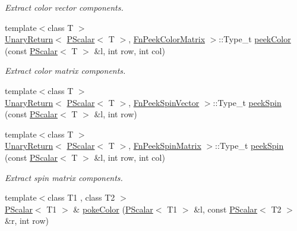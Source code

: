 \begin{DoxyCompactItemize}
\begin{DoxyCompactList}\small\item\em Extract color vector components. \end{DoxyCompactList}\item 
{\footnotesize template$<$class T $>$ }\\\mbox{\hyperlink{structENSEM_1_1UnaryReturn}{Unary\+Return}}$<$ \mbox{\hyperlink{classENSEM_1_1PScalar}{P\+Scalar}}$<$ T $>$, \mbox{\hyperlink{structENSEM_1_1FnPeekColorMatrix}{Fn\+Peek\+Color\+Matrix}} $>$\+::Type\+\_\+t \mbox{\hyperlink{group__primscalar_ga5e0077638719795b3ad6bba20ddb9d4d}{peek\+Color}} (const \mbox{\hyperlink{classENSEM_1_1PScalar}{P\+Scalar}}$<$ T $>$ \&l, int row, int col)
\begin{DoxyCompactList}\small\item\em Extract color matrix components. \end{DoxyCompactList}\item 
{\footnotesize template$<$class T $>$ }\\\mbox{\hyperlink{structENSEM_1_1UnaryReturn}{Unary\+Return}}$<$ \mbox{\hyperlink{classENSEM_1_1PScalar}{P\+Scalar}}$<$ T $>$, \mbox{\hyperlink{structENSEM_1_1FnPeekSpinVector}{Fn\+Peek\+Spin\+Vector}} $>$\+::Type\+\_\+t \mbox{\hyperlink{group__primscalar_gae58d7282a3d7b7cb78a43c300314fd16}{peek\+Spin}} (const \mbox{\hyperlink{classENSEM_1_1PScalar}{P\+Scalar}}$<$ T $>$ \&l, int row)
\item 
{\footnotesize template$<$class T $>$ }\\\mbox{\hyperlink{structENSEM_1_1UnaryReturn}{Unary\+Return}}$<$ \mbox{\hyperlink{classENSEM_1_1PScalar}{P\+Scalar}}$<$ T $>$, \mbox{\hyperlink{structENSEM_1_1FnPeekSpinMatrix}{Fn\+Peek\+Spin\+Matrix}} $>$\+::Type\+\_\+t \mbox{\hyperlink{group__primscalar_gae6a011ab6458165e95b6e647d6684b7b}{peek\+Spin}} (const \mbox{\hyperlink{classENSEM_1_1PScalar}{P\+Scalar}}$<$ T $>$ \&l, int row, int col)
\begin{DoxyCompactList}\small\item\em Extract spin matrix components. \end{DoxyCompactList}\item 
{\footnotesize template$<$class T1 , class T2 $>$ }\\\mbox{\hyperlink{classENSEM_1_1PScalar}{P\+Scalar}}$<$ T1 $>$ \& \mbox{\hyperlink{group__primscalar_ga7e556b2cf2409e6342b4591b4d4fb83f}{poke\+Color}} (\mbox{\hyperlink{classENSEM_1_1PScalar}{P\+Scalar}}$<$ T1 $>$ \&l, const \mbox{\hyperlink{classENSEM_1_1PScalar}{P\+Scalar}}$<$ T2 $>$ \&r, int row)

\end{DoxyCompactItemize}
